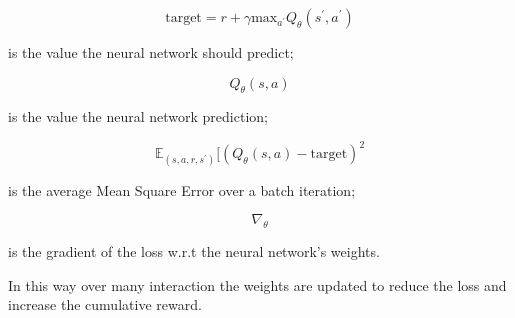 \documentclass[14pt]{extarticle}
\begin{document}
\begin{flushleft}
\begin{equation} \label{eq:target}
\text{target} = r + \gamma\text{max}_{a^\prime}Q_{\theta}(s^{\prime},a^{\prime})
\end{equation}
\vspace{-10mm}
\begin{center}
is the value the neural network should predict;
\end{center}

\[Q_{\theta}(s,a)\]
\vspace{-10mm}
\begin{center}
is the value the neural network prediction;
\end{center}

\[\mathbb{E}_{(s,a,r,s^\prime)}[(Q_{\theta}(s,a) - \text{target})^2\] 
\vspace{-10mm}
\begin{center}
is the average Mean Square Error over a batch iteration;
\end{center}

\[\nabla_{\theta}\]
\vspace{-10mm}
\begin{center}
is the gradient of the loss w.r.t the neural network's weights.
\end{center}

In this way over many interaction the weights are updated to reduce the loss and increase the cumulative reward. 
\end{flushleft}
\end{document}
